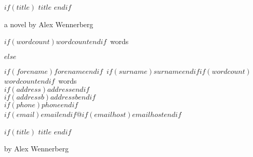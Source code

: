 \documentclass[12pt]{scrartcl}
\def\forename{$if(forename)$$forename$$endif$}
\def\surname{$if(surname)$$surname$$endif$}
\def\wordcount{$if(wordcount)$$wordcount$$endif$}
\def\address{$if(address)$$address$$endif$}
\def\addressb{$if(addressb)$$addressb$$endif$}
\def\phone{$if(phone)$$phone$$endif$}
\def\email{$if(email)$$email$$endif$}
\def\emailhost{$if(emailhost)$$emailhost$$endif$}
\newif\ifcover
\begin{document}
    \vspace*{0.3\textheight} 


    \begin{singlespace}\begin{center}
    $if(title)$
      \MakeUppercase{$title$}
      \vspace{12pt}
    $endif$

    a novel by Alex Wennerberg
    \end{center}\end{singlespace}


    \vfill


    \center \wordcount~words


    \clearpage\vspace*{0.3\textheight}


    \setcounter{page}{1}
    \coverfalse


  $else$

    \begin{singlespace}
    \forename~\surname \hfill \wordcount~words\\
    \address\\
    \addressb\\
    \phone\\
    \email @\emailhost
    \end{singlespace}


    \vspace*{0.3\textheight}

    \begin{singlespace}\begin{center}
    $if(title)$
      \MakeUppercase{$title$}
      \vspace{12pt}
    $endif$

    by Alex Wennerberg
    \end{center}\end{singlespace}
\end{document}

